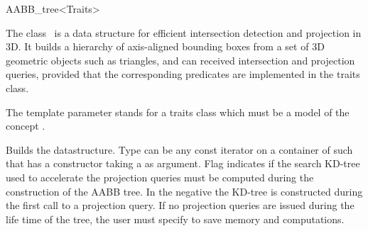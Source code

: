 \ccRefPageBegin


\begin{ccRefClass}{AABB_tree<Traits>}  %


\ccDefinition
  
The class \ccRefName\ is a data structure for efficient intersection detection and projection in 3D. It builds a hierarchy of axis-aligned bounding boxes from a set of 3D geometric objects such as triangles, and can received intersection and projection queries, provided that the corresponding predicates are implemented in the traits class. 

The template parameter  stands for a traits class which must be a model of the concept .




\ccTypes

\ccGlue
{}
\ccGlue
{}
\ccGlue
{}

\ccCreation
{}  %

{Builds the datastructure. Type  can be any const iterator on a container of  such that  has a constructor taking a  as argument. Flag  indicates if the search KD-tree used to accelerate the projection queries must be computed during the construction of the AABB tree. In the negative the KD-tree is constructed during the first call to a projection query. If no projection queries are issued during the life time of the tree, the user must specify  to save memory and computations. }


\end{ccRefClass}
